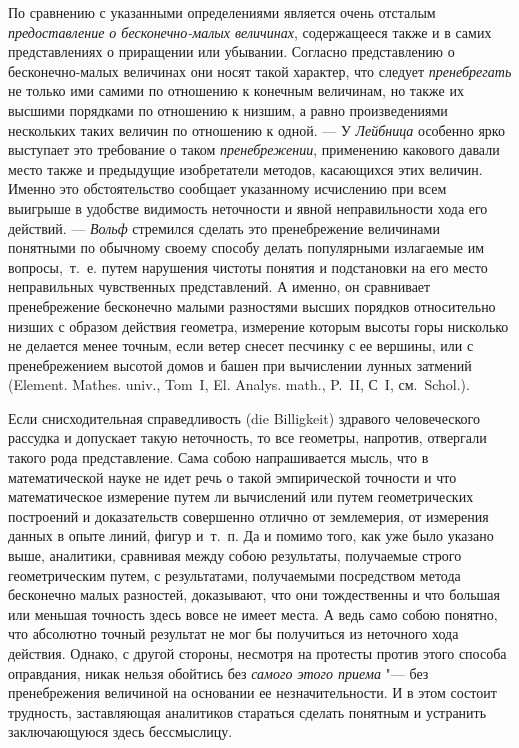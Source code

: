 {По сравнению с указанными определениями является очень отсталым
{\em предоставление о бесконечно-малых величинах},
содержащееся также и в самих представлениях о приращении или убывании.
Согласно представлению о бесконечно-малых величинах они носят такой
характер, что следует {\em пренебрегать} не только ими
самими по отношению к конечным величинам, но также их высшими порядками по
отношению к низшим, а равно произведениями нескольких таких величин по
отношению к одной. — У {\em Лейбница} особенно ярко
выступает это требование о таком {\em пренебрежении},
применению какового давали место также и предыдущие изобретатели методов,
касающихся этих величин. Именно это обстоятельство сообщает указанному
исчислению при всем выигрыше в удобстве видимость неточности и явной
неправильности хода его действий. — {\em Вольф}
стремился сделать это пренебрежение величинами понятными по обычному своему
способу делать популярными излагаемые им вопросы,~т.~е. путем нарушения
чистоты понятия и подстановки на его место неправильных чувственных
представлений. А именно, он сравнивает пренебрежение бесконечно малыми
разностями высших порядков относительно низших с образом действия геометра,
измерение которым высоты горы нисколько не делается менее точным, если
ветер снесет песчинку с ее вершины, или с пренебрежением высотой домов и
башен при вычислении лунных затмений (Element. Mathes. univ.,
Tom~I, El. Analys. math., P.~II, С~I, см.~Schol.).

Если снисходительная справедливость (die Billigkeit) здравого человеческого
рассудка и допускает такую неточность, то все геометры, напротив, отвергали
такого рода представление. Сама собою напрашивается мысль, что в
математической науке не идет речь о такой эмпирической точности и что
математическое измерение путем ли вычислений или путем геометрических
построений и доказательств совершенно отлично от землемерия, от измерения
данных в опыте линий, фигур и~т.~п. Да и помимо того, как уже было указано
выше, аналитики, сравнивая между собою результаты, получаемые строго
геометрическим путем, с результатами, получаемыми посредством метода
бесконечно малых разностей, доказывают, что они тождественны и что большая
или меньшая точность здесь вовсе не имеет места. А ведь само собою понятно,
что абсолютно точный результат не мог бы получиться из неточного хода
действия. Однако, с другой стороны, несмотря на протесты против этого
способа оправдания, никак нельзя обойтись без
{\em самого этого приема} "--- без пренебрежения величиной
на основании ее незначительности. И в этом состоит трудность, заставляющая
аналитиков стараться сделать понятным и устранить заключающуюся здесь
бессмыслицу.

}
